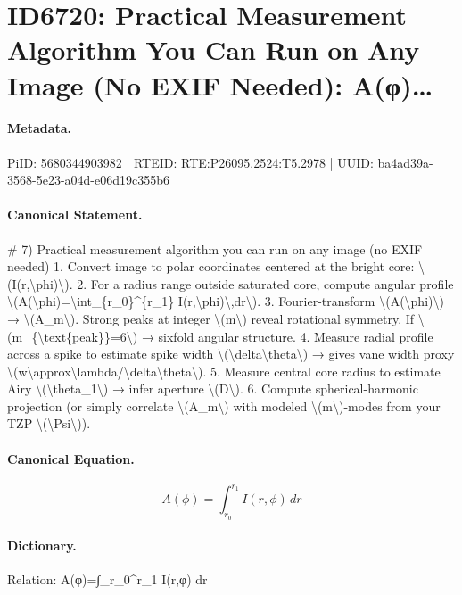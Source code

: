 \section*{ID6720: Practical Measurement Algorithm You Can Run on Any Image (No EXIF Needed): A(φ)…}
\paragraph{Metadata.}
PiID: 5680344903982 | RTEID: RTE:P26095.2524:T5.2978 | UUID: ba4ad39a-3568-5e23-a04d-e06d19c355b6

\paragraph{Canonical Statement.}
\# 7) Practical measurement algorithm you can run on any image (no EXIF needed) 1. Convert image to polar coordinates centered at the bright core: \textbackslash{}(I(r,\textbackslash{}phi)\textbackslash{}). 2. For a radius range outside saturated core, compute angular profile \textbackslash{}(A(\textbackslash{}phi)=\textbackslash{}int\_\{r\_0\}\textasciicircum{}\{r\_1\} I(r,\textbackslash{}phi)\textbackslash{},dr\textbackslash{}). 3. Fourier-transform \textbackslash{}(A(\textbackslash{}phi)\textbackslash{}) → \textbackslash{}(A\_m\textbackslash{}). Strong peaks at integer \textbackslash{}(m\textbackslash{}) reveal rotational symmetry. If \textbackslash{}(m\_\{\textbackslash{}text\{peak\}\}=6\textbackslash{}) → sixfold angular structure. 4. Measure radial profile across a spike to estimate spike width \textbackslash{}(\textbackslash{}delta\textbackslash{}theta\textbackslash{}) → gives vane width proxy \textbackslash{}(w\textbackslash{}approx\textbackslash{}lambda/\textbackslash{}delta\textbackslash{}theta\textbackslash{}). 5. Measure central core radius to estimate Airy \textbackslash{}(\textbackslash{}theta\_1\textbackslash{}) → infer aperture \textbackslash{}(D\textbackslash{}). 6. Compute spherical-harmonic projection (or simply correlate \textbackslash{}(A\_m\textbackslash{}) with modeled \textbackslash{}(m\textbackslash{})-modes from your TZP \textbackslash{}(\textbackslash{}Psi\textbackslash{})).

\paragraph{Canonical Equation.}
\[
A(\phi)=\int_{r_0}^{r_1} I(r,\phi)\,dr
\]

\paragraph{Dictionary.}
Relation: A(φ)=∫\_r\_0\textasciicircum{}r\_1 I(r,φ) dr

